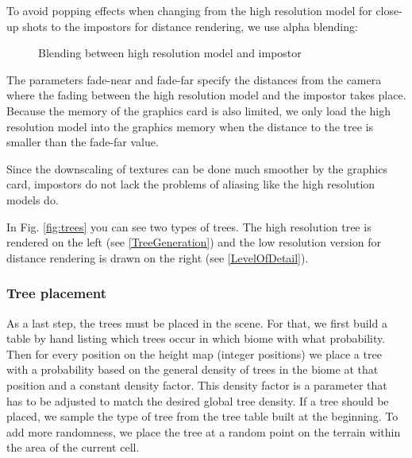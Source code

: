\documentclass[journal, letterpaper]{IEEEtran}
\begin{document}
To avoid popping effects when changing from the high resolution model for close-up shots to the impostors for distance rendering, we use alpha blending:
\begin{figure}[H]
	\centering
	\caption{Blending between high resolution model and \mbox{impostor}}
	\label{fig:ImpostorBlending}
\end{figure}
The parameters fade-near and fade-far specify the distances from the camera where the fading between the high resolution model and the impostor takes place.
Because the memory of the graphics card is also limited, we only load the high resolution model into the graphics memory when the distance to the tree is smaller than the fade-far value.

Since the downscaling of textures can be done much smoother by the graphics card, impostors do not lack the problems of aliasing like the high resolution models do.

In Fig. \ref{fig:trees} you can see two types of trees. The high resolution tree is rendered on the left (see \ref{TreeGeneration}) and the low resolution version for distance rendering is drawn on the right (see \ref{LevelOfDetail}).

\subsubsection{Tree placement}
As a last step, the trees must be placed in the scene. For that, we first build a table by hand listing which trees occur in which biome with what probability. Then for every position on the height map (integer positions) we place a tree with a probability based on the general density of trees in the biome at that position and a constant density factor. This density factor is a parameter that has to be adjusted to match the desired global tree density. If a tree should be placed, we sample the type of tree from the tree table built at the beginning. To add more randomness, we place the tree at a random point on the terrain within the area of the current cell.
\end{document}
